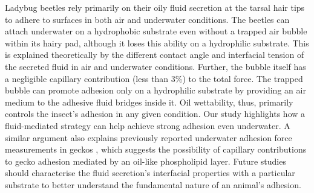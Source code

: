 \documentclass[vruler,JEB]{COB}%
\begin{document}
Ladybug beetles rely primarily on their oily fluid secretion at the tarsal hair tips to adhere
to surfaces in both air and underwater conditions. The beetles can
attach underwater on a hydrophobic substrate even without a trapped
air bubble within its hairy pad, although it loses this ability on
a hydrophilic substrate. This is explained theoretically by the different
contact angle and interfacial tension of the secreted fluid in air
and underwater conditions. Further, the bubble itself has a negligible
capillary contribution (less than 3\%) to the total force. The trapped bubble can
promote adhesion only on a hydrophilic substrate by providing an air
medium to the adhesive fluid bridges inside it. Oil wettability, thus,
primarily controls the insect's adhesion in any given condition. 
Our study highlights how a fluid-mediated strategy can help achieve strong adhesion even underwater. A
similar argument also explains previously reported underwater adhesion force measurements
in geckos \citep{RN15}, which suggests the possibility of capillary
contributions to gecko adhesion mediated by an oil-like phospholipid layer. Future studies should characterise
the fluid secretion's interfacial properties with a particular substrate
to better understand the fundamental nature of an animal's adhesion.







\end{document}
